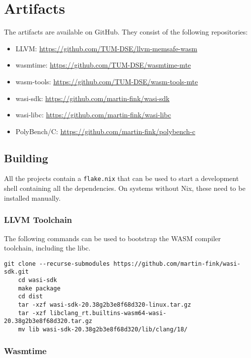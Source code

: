 \chapter{Artifacts}
\label{ch:artifacts}

The artifacts are available on GitHub.
They consist of the following repositories:

\begin{itemize}
    \item LLVM: \url{https://github.com/TUM-DSE/llvm-memsafe-wasm}
    \item wasmtime: \url{https://github.com/TUM-DSE/wasmtime-mte}
    \item wasm-tools: \url{https://github.com/TUM-DSE/wasm-tools-mte}
    \item wasi-sdk: \url{https://github.com/martin-fink/wasi-sdk}
    \item wasi-libc: \url{https://github.com/martin-fink/wasi-libc}
    \item PolyBench/C: \url{https://github.com/martin-fink/polybench-c}
\end{itemize}

\section{Building}
\label{sec:building}

All the projects contain a \texttt{flake.nix} that can be used to start a development shell containing all the dependencies.
On systems without Nix, these need to be installed manually.

\subsection{LLVM Toolchain}
\label{subsec:llvm-toolchain}

The following commands can be used to bootstrap the \ac{WASM} compiler toolchain, including the libc.

\begin{lstlisting}[label={lst:building-sdk}]
    git clone --recurse-submodules https://github.com/martin-fink/wasi-sdk.git
    cd wasi-sdk
    make package
    cd dist
    tar -xzf wasi-sdk-20.38g2b3e8f68d320-linux.tar.gz
    tar -xzf libclang_rt.builtins-wasm64-wasi-20.38g2b3e8f68d320.tar.gz
    mv lib wasi-sdk-20.38g2b3e8f68d320/lib/clang/18/
\end{lstlisting}

\subsection{Wasmtime}
\label{subsec:building-wasmtime}

